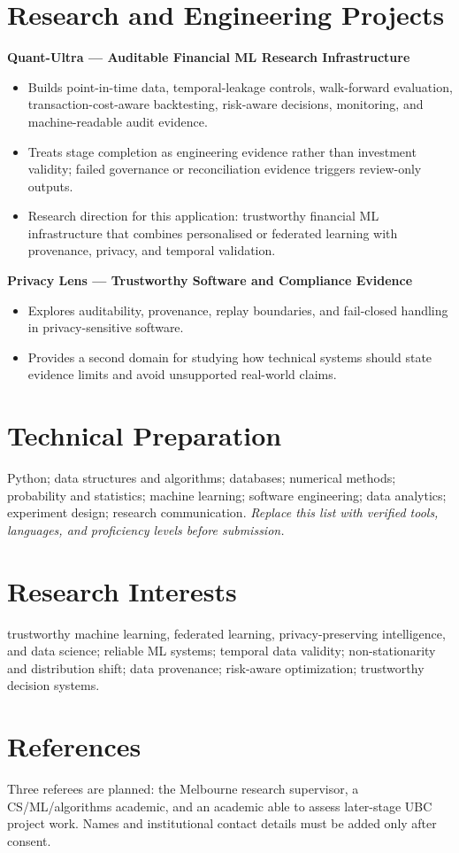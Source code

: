 \documentclass[11pt]{article}
\begin{document}
\section*{Research and Engineering Projects}
\textbf{Quant-Ultra --- Auditable Financial ML Research Infrastructure}
\begin{itemize}
\item Builds point-in-time data, temporal-leakage controls, walk-forward evaluation, transaction-cost-aware backtesting, risk-aware decisions, monitoring, and machine-readable audit evidence.
\item Treats stage completion as engineering evidence rather than investment validity; failed governance or reconciliation evidence triggers review-only outputs.
\item Research direction for this application: trustworthy financial ML infrastructure that combines personalised or federated learning with provenance, privacy, and temporal validation.
\end{itemize}

\begin{samepage}
\textbf{Privacy Lens --- Trustworthy Software and Compliance Evidence}
\begin{itemize}
\item Explores auditability, provenance, replay boundaries, and fail-closed handling in privacy-sensitive software.
\item Provides a second domain for studying how technical systems should state evidence limits and avoid unsupported real-world claims.
\end{itemize}
\end{samepage}

\section*{Technical Preparation}
Python; data structures and algorithms; databases; numerical methods; probability and statistics; machine learning; software engineering; data analytics; experiment design; research communication. \textit{Replace this list with verified tools, languages, and proficiency levels before submission.}

\section*{Research Interests}
trustworthy machine learning, federated learning, privacy-preserving intelligence, and data science; reliable ML systems; temporal data validity; non-stationarity and distribution shift; data provenance; risk-aware optimization; trustworthy decision systems.

\section*{References}
Three referees are planned: the Melbourne research supervisor, a CS/ML/algorithms academic, and an academic able to assess later-stage UBC project work. Names and institutional contact details must be added only after consent.
\end{document}
